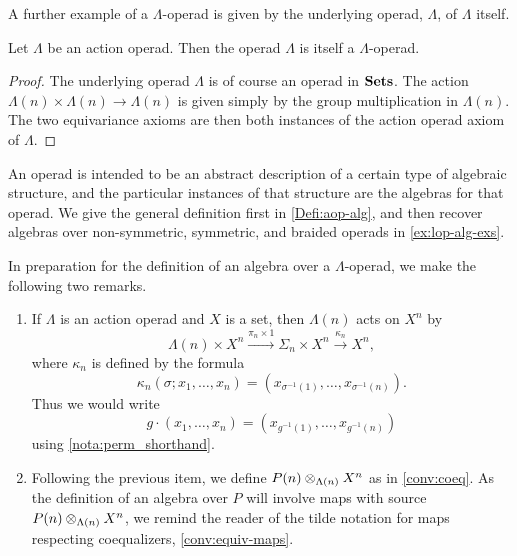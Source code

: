A further example of a $\Lambda$-operad is given by the underlying operad, $\Lambda$, of $\Lambda$ itself.
\begin{prop}\label{prop:gisgop}
Let $\Lambda$ be an action operad. Then the operad $\Lambda$ is itself a $\Lambda$-operad.
\end{prop}
\begin{proof}
The underlying operad $\Lambda$ is of course an operad in $\mathbf{Sets}$. The action $\Lambda(n) \times \Lambda(n) \rightarrow \Lambda(n)$ is given simply by the group multiplication in $\Lambda(n)$. The two equivariance axioms are then both instances of the action operad axiom of $\Lambda$.
\end{proof}

An operad is intended to be an abstract description of a certain type of algebraic structure, and the particular instances of that structure are the algebras for that operad. 
We give the general definition first in \cref{Defi:aop-alg}, and then recover algebras over non-symmetric, symmetric, and braided operads in \cref{ex:lop-alg-exs}.

\begin{rem}\label{rem:aop-alg-pre}
In preparation for the definition of an algebra over a $\Lambda$-operad, we make the following two remarks.
\begin{enumerate}
\item If $\Lambda$ is an action operad and $X$ is a set, then $\Lambda(n)$ acts on $X^n$ by 
\[
\Lambda(n) \times X^n \stackrel{\pi_n \times 1}{\to} \Sigma_n \times X^n \stackrel{\kappa_n}{\to} X^n,
\]
where $\kappa_n$ is defined by the formula
\[
\kappa_n(\sigma; x_1, \ldots, x_n) = (x_{\sigma^{-1}(1)}, \ldots, x_{\sigma^{-1}(n)}).
\]
Thus we would write
\[
g \cdot (x_1, \ldots, x_n) = (x_{g^{-1}(1)}, \ldots, x_{g^{-1}(n)})
\]
using \cref{nota:perm_shorthand}.
\item Following the previous item, we define $P(n) \otimes_{\Lambda(n)} X^{n}$ as in \cref{conv:coeq}. As the definition of an algebra over $P$ will involve maps with source $P(n) \otimes_{\Lambda(n)} X^{n}$, we remind the reader of the tilde notation for maps respecting coequalizers, \cref{conv:equiv-maps}.
\end{enumerate}
\end{rem}

